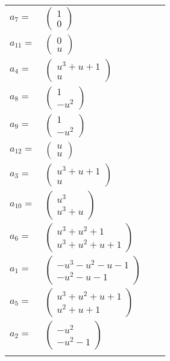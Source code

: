 \documentclass[1p]{elsarticle_modified}
\theoremstyle{definition}
\begin{document}
\begin{tabular}{m{7pt} m{180pt} m{7pt} m{180pt} }
\flushright $a_{7}=$&$\begin{pmatrix}1\\0\end{pmatrix}$ \\
\flushright $a_{11}=$&$\begin{pmatrix}0\\u\end{pmatrix}$ \\
\flushright $a_{4}=$&$\begin{pmatrix}u^3+u+1\\u\end{pmatrix}$ \\
\flushright $a_{8}=$&$\begin{pmatrix}1\\- u^2\end{pmatrix}$ \\
\flushright $a_{9}=$&$\begin{pmatrix}1\\- u^2\end{pmatrix}$ \\
\flushright $a_{12}=$&$\begin{pmatrix}u\\u\end{pmatrix}$ \\
\flushright $a_{3}=$&$\begin{pmatrix}u^3+u+1\\u\end{pmatrix}$ \\
\flushright $a_{10}=$&$\begin{pmatrix}u^3\\u^3+u\end{pmatrix}$ \\
\flushright $a_{6}=$&$\begin{pmatrix}u^3+u^2+1\\u^3+u^2+u+1\end{pmatrix}$ \\
\flushright $a_{1}=$&$\begin{pmatrix}- u^3- u^2- u-1\\- u^2- u-1\end{pmatrix}$ \\
\flushright $a_{5}=$&$\begin{pmatrix}u^3+u^2+u+1\\u^2+u+1\end{pmatrix}$ \\
\flushright $a_{2}=$&$\begin{pmatrix}- u^2\\- u^2-1\end{pmatrix}$\\&\end{tabular}
\end{document}
